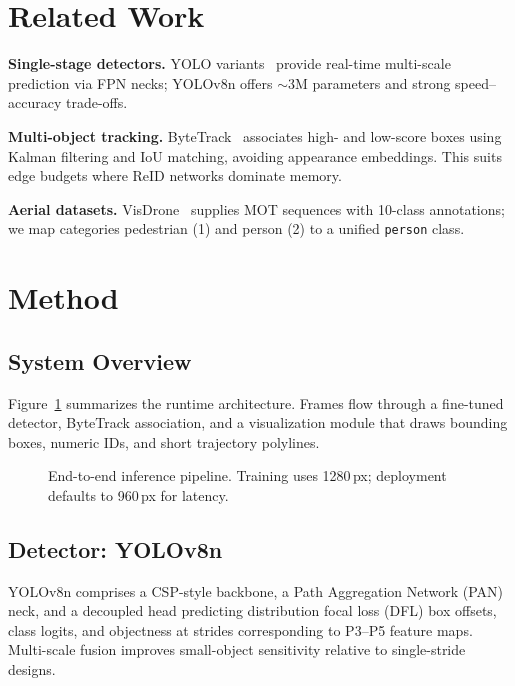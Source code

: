 \documentclass[10pt,twocolumn,letterpaper]{article}
\begin{document}
\section{Related Work}
\textbf{Single-stage detectors.} YOLO variants~\cite{yolo} provide real-time multi-scale prediction via FPN necks; YOLOv8n offers $\sim$3M parameters and strong speed--accuracy trade-offs.

\textbf{Multi-object tracking.} ByteTrack~\cite{bytetrack} associates high- and low-score boxes using Kalman filtering and IoU matching, avoiding appearance embeddings. This suits edge budgets where ReID networks dominate memory.

\textbf{Aerial datasets.} VisDrone~\cite{visdrone} supplies MOT sequences with 10-class annotations; we map categories pedestrian (1) and person (2) to a unified \texttt{person} class.

\section{Method}
\label{sec:method}

\subsection{System Overview}
Figure~\ref{fig:pipeline} summarizes the runtime architecture. Frames flow through a fine-tuned detector, ByteTrack association, and a visualization module that draws bounding boxes, numeric IDs, and short trajectory polylines.

\begin{figure}[t]
  \centering
  \caption{End-to-end inference pipeline. Training uses 1280\,px; deployment defaults to 960\,px for latency.}
  \label{fig:pipeline}
\end{figure}

\subsection{Detector: YOLOv8n}
YOLOv8n comprises a CSP-style backbone, a Path Aggregation Network (PAN) neck, and a decoupled head predicting distribution focal loss (DFL) box offsets, class logits, and objectness at strides corresponding to P3--P5 feature maps. Multi-scale fusion improves small-object sensitivity relative to single-stride designs.
\end{document}
